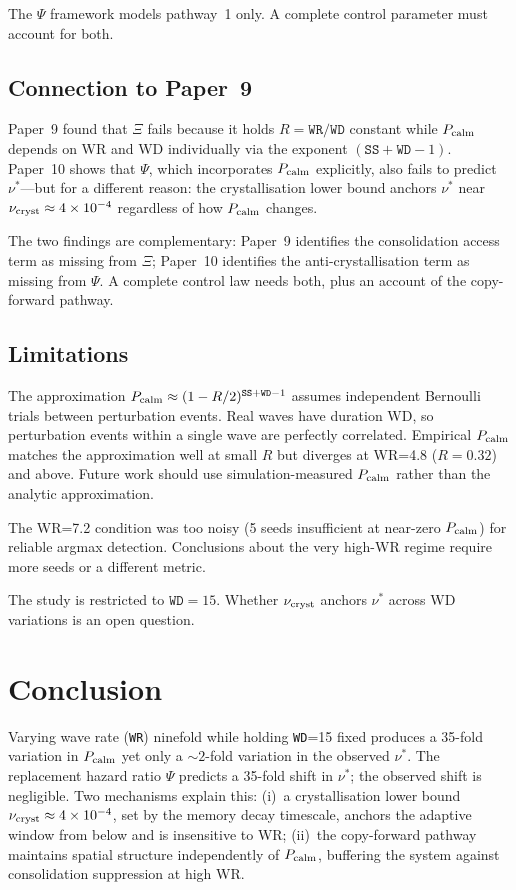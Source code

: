 \documentclass[11pt]{article}
\begin{document}
The $\Psi$ framework models pathway~1 only.
A complete control parameter must account for both.

\subsection{Connection to Paper~9}

Paper~9 found that $\Xi$ fails because it holds $R = \texttt{WR}/\texttt{WD}$
constant while $P_{\rm calm}$ depends on WR and WD individually via the exponent
$(\texttt{SS}+\texttt{WD}-1)$.
Paper~10 shows that $\Psi$, which incorporates $P_{\rm calm}$ explicitly, also
fails to predict $\nu^*$---but for a different reason: the crystallisation lower
bound anchors $\nu^*$ near $\nu_{\rm cryst} \approx 4\times10^{-4}$ regardless
of how $P_{\rm calm}$ changes.

The two findings are complementary:
Paper~9 identifies the consolidation access term as missing from $\Xi$;
Paper~10 identifies the anti-crystallisation term as missing from $\Psi$.
A complete control law needs both, plus an account of the copy-forward pathway.

\subsection{Limitations}

The approximation $P_{\rm calm} \approx (1-R/2)^{\texttt{SS}+\texttt{WD}-1}$
assumes independent Bernoulli trials between perturbation events.
Real waves have duration WD, so perturbation events within a single wave are
perfectly correlated.
Empirical $P_{\rm calm}$ matches the approximation well at small $R$ but
diverges at WR=4.8 ($R=0.32$) and above.
Future work should use simulation-measured $P_{\rm calm}$ rather than the
analytic approximation.

The WR=7.2 condition was too noisy (5 seeds insufficient at near-zero $P_{\rm calm}$)
for reliable argmax detection.
Conclusions about the very high-WR regime require more seeds or a different
metric.

The study is restricted to $\texttt{WD}=15$.
Whether $\nu_{\rm cryst}$ anchors $\nu^*$ across WD variations is an open question.

\section{Conclusion}

Varying wave rate (\texttt{WR}) ninefold while holding \texttt{WD}=15 fixed
produces a 35-fold variation in $P_{\rm calm}$ yet only a $\sim 2$-fold variation
in the observed $\nu^*$.
The replacement hazard ratio $\Psi$ predicts a 35-fold shift in $\nu^*$;
the observed shift is negligible.
Two mechanisms explain this:
(i)~a crystallisation lower bound $\nu_{\rm cryst} \approx 4\times10^{-4}$,
set by the memory decay timescale, anchors the adaptive window from below and
is insensitive to WR;
(ii)~the copy-forward pathway maintains spatial structure independently of
$P_{\rm calm}$, buffering the system against consolidation suppression at high WR.
\end{document}
